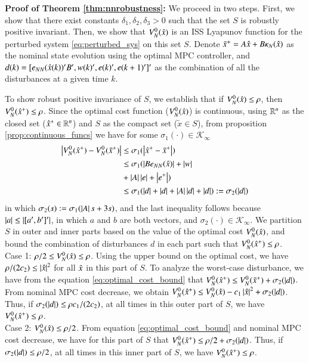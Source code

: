 \documentclass[preprint,5p, twocolumn, authoryear]{elsarticle}
\begin{document}
\textbf{Proof of Theorem \ref{thm:nnrobustness}:}
We proceed in two steps. First, 
we show that there exist constants $\delta_1, \delta_2, \delta_3 > 0$
such that the set $S$ is robustly positive invariant. Then, we 
show that $V_N^0(\hat{x})$ is an ISS Lyapunov function for 
the perturbed system \eqref{eq:perturbed_sys} on this set $S$. Denote 
$\tilde{x}^+ = A\hat{x} + B\kappa_N(\hat{x})$ as the nominal 
state evolution using the optimal MPC controller, 
and $d(k) = [ e_{NN}(\hat{x}(k))'B', w(k)', e(k)', e(k+1)']'$
as the combination of all the disturbances at a given time $k$. 

To show robust positive invariance of $S$,  
we establish that if $V_N^0(\hat{x}) \leq \rho$, 
then $V_N^0(\hat{x}^+) \leq \rho$.
Since the optimal 
cost function ($V_N^0(\hat{x})$) is continuous,
using $\mathbb{R}^n$ as the closed set ($\hat{x}^+ \in \mathbb{R}^n$) 
and $S$ as the compact set ($\tilde{x} \in S$),
from proposition \ref{prop:continuous_funcs} we have
for some $\sigma_1(\cdot) \in \mathcal{K}_{\infty}$
\begin{align}
    \left| V_N^0(\hat{x}^+) - V_N^0(\tilde{x}^+) \right| &\leq 
    \sigma_1(\left| \hat{x}^+ - \tilde{x}^+ \right|)  \nonumber  \\
    &\leq 
   \sigma_1(\left| B e_{NN}(\hat{x}) \right| + \left| w \right| 
   \nonumber \\
   & + \left| A \right|\left| e \right| +  \left| e^+ \right|) \nonumber \\
     &\leq 
   \sigma_1(\left| d \right| + \left| d \right| + \left| A \right|\left| d \right| + \left| d \right|) 
   := \sigma_2(\left| d \right|)
   \label{eq:optimal_cost_bound}
\end{align}
in which $\sigma_2(s) := \sigma_1(\left| A \right| s +3s)$, and the last inequality 
follows because $\left| a \right| \leq \left| [a', b']' \right|$, in which $a$ and $b$
are both vectors, and $\sigma_2(\cdot) \in \mathcal{K}_{\infty}$.
We partition $S$ in outer and inner parts based on 
the value of the optimal cost $V_N^0(\hat{x})$, and bound the 
combination of disturbances $d$ in each part 
such that $V_N^0(\hat{x}^+) \leq \rho$. \\
Case 1: $\rho/2 \leq V_N^0(\hat{x}) \leq \rho $. Using the 
upper bound on the optimal cost, we have 
$\rho/(2c_2) \leq \left| \hat{x} \right|^2$ for all $\hat{x}$ 
in this part of $S$. To analyze the worst-case disturbance, 
we have from the equation \eqref{eq:optimal_cost_bound} that 
$V_N^0(\hat{x}^+) \leq V_N^0(\tilde{x}^+) + \sigma_2(\left| d \right|) $.
From nominal MPC cost decrease, we obtain  
$V_N^0(\hat{x}^+) \leq V_N^0(\hat{x}) - c_1\left| \hat{x} \right|^2 + 
\sigma_2(\left| d \right|)$. Thus, if $\sigma_2(\left| d \right|) \leq \rho c_1/(2c_2)$, 
at all times in this outer part of $S$, we have 
$V_N^0(\hat{x}^+) \leq \rho$. \\
Case 2: $V_N^0(\hat{x}) \leq \rho/2 $. From 
equation \eqref{eq:optimal_cost_bound} and nominal MPC 
cost decrease, we have for this part of $S$ that 
$V_N^0(\hat{x}^+) \leq \rho/2 + \sigma_2(\left| d \right|)$.
Thus, if $\sigma_2(\left| d \right|) \leq \rho/2$, 
at all times in this inner part of $S$, we have 
$V_N^0(\hat{x}^+) \leq \rho$.
\end{document}
